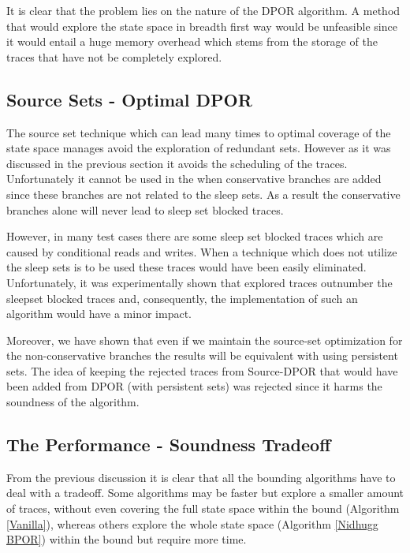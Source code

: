 It is clear that the problem lies on the nature of the DPOR algorithm. A method that would explore the state space in breadth first way would be unfeasible since it would
entail a huge memory overhead which stems from the storage of the traces that have not be completely explored. 

\subsection{Source Sets - Optimal DPOR}
The source set technique which can lead many times to optimal coverage of the state space manages avoid the exploration of redundant sets. However as it was discussed
in the previous section it avoids the scheduling of the traces. Unfortunately it cannot be used in the when conservative branches are added since these branches are not
related to the sleep sets. As a result the conservative branches alone will never lead to sleep set blocked traces.

However, in many test cases there are some sleep set blocked traces which are caused by conditional reads and writes. When a technique which does not utilize 
the sleep sets is to be used these traces would have been easily eliminated. Unfortunately, it was experimentally shown that explored traces outnumber the sleepset blocked
traces and, consequently, the implementation of such an algorithm would have a minor impact.

Moreover, we have shown that even if we maintain the source-set optimization for the non-conservative branches the results will be equivalent with using
persistent sets. 
The idea of keeping the rejected traces from Source-DPOR that would have been added from DPOR (with persistent sets) was rejected since it harms
the soundness of the algorithm.

\subsection {The Performance - Soundness Tradeoff}

From the previous discussion it is clear that all the bounding algorithms have to deal with a tradeoff. Some algorithms may be faster but
explore a smaller amount of traces, without even covering the full state space within the bound (Algorithm \ref{Vanilla}), 
whereas others explore the whole state space (Algorithm \ref{Nidhugg BPOR}) within the bound but require more time.
